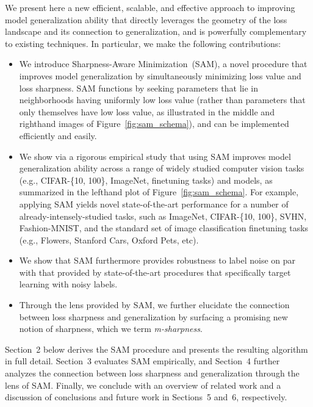 \documentclass{article} %
\begin{document}
We present here a new efficient, scalable, and effective approach to improving model generalization ability that directly leverages the geometry of the loss landscape and its connection to generalization, and is powerfully complementary to existing techniques.  In particular, we make the following contributions:
\begin{itemize}
\item We introduce Sharpness-Aware Minimization~(SAM), a novel procedure that improves model generalization by simultaneously minimizing loss value and loss sharpness.  SAM functions by seeking parameters that lie in neighborhoods having uniformly low loss value (rather than parameters that only themselves have low loss value, as illustrated in the middle and righthand images of Figure~\ref{fig:sam_schema}), and can be implemented efficiently and easily.
\item We show via a rigorous empirical study that using SAM improves model generalization ability across a range of widely studied computer vision tasks (e.g., CIFAR-\{10, 100\}, ImageNet, finetuning tasks) and models, as summarized in the lefthand plot of Figure~\ref{fig:sam_schema}.  For example, applying SAM yields novel state-of-the-art performance for a number of already-intensely-studied tasks, such as ImageNet, CIFAR-\{10, 100\}, SVHN, Fashion-MNIST, and the standard set of image classification finetuning tasks (e.g., Flowers, Stanford Cars, Oxford Pets, etc).
\item We show that SAM furthermore provides robustness to label noise on par with that provided by state-of-the-art procedures that specifically target learning with noisy labels.
\item Through the lens provided by SAM, we further elucidate the connection between loss sharpness and generalization by surfacing a promising new notion of sharpness, which we term \textit{m-sharpness}.
\end{itemize}

Section~2 below derives the SAM procedure and presents the resulting algorithm in full detail.  Section~3 evaluates SAM empirically, and Section~4 further analyzes the connection between loss sharpness and generalization through the lens of SAM.  Finally, we conclude with an overview of related work and a discussion of conclusions and future work in Sections~5 and~6, respectively.
\end{document}
